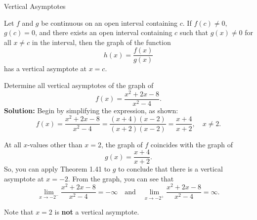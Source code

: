 \documentclass[12pt]{article}
\theoremstyle{beautifulthm}
\begin{document}
\begin{mytheorem}{Vertical Asymptotes}{}

Let $f$ and $g$ be continuous on an open interval containing $c$. If $f(c) \neq 0$, $g(c) = 0$, and there exists an open interval containing $c$ such that $g(x) \neq 0$ for all $x \neq c$ in the interval, then the graph of the function
\[
h(x) = \frac{f(x)}{g(x)}
\]
has a vertical asymptote at $x = c$.


\end{mytheorem}

\begin{tcolorbox}[colback=examplebg, colframe=red!75!black, title=\textbf{EXAMPLE 2: A Rational Function with Common Factors}, fonttitle=\bfseries, sharp corners]
Determine all vertical asymptotes of the graph of 
\[
f(x) = \frac{x^2 + 2x - 8}{x^2 - 4}.
\]
\tcblower
\textbf{Solution:}
Begin by simplifying the expression, as shown:
\[
f(x) = \frac{x^2 + 2x - 8}{x^2 - 4} = \frac{(x + 4)(x - 2)}{(x + 2)(x - 2)} = \frac{x + 4}{x + 2}, \quad x \neq 2.
\]

At all $x$-values other than $x = 2$, the graph of $f$ coincides with the graph of 
\[
g(x) = \frac{x + 4}{x + 2}.
\]
So, you can apply Theorem 1.41 to $g$ to conclude that there is a vertical asymptote at $x = -2$. From the graph, you can see that
\[
\lim_{x \to -2^-} \frac{x^2 + 2x - 8}{x^2 - 4} = -\infty \quad \text{and} \quad \lim_{x \to -2^+} \frac{x^2 + 2x - 8}{x^2 - 4} = \infty.
\]

Note that $x = 2$ is \textbf{not} a vertical asymptote.
\end{tcolorbox}
\end{document}
